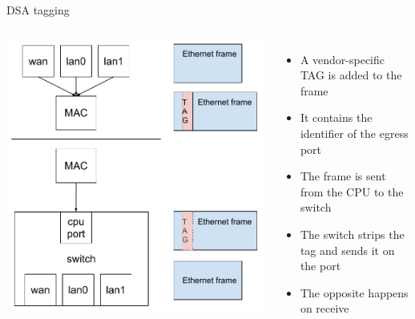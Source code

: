 \begin{frame}{DSA tagging}
	\begin{columns}
		\includegraphics[width=\textwidth]{slides/networking-driver-switch/dsa_tagging.pdf}
	\begin{itemize}
		\item A vendor-specific TAG is added to the frame
		\item It contains the identifier of the egress port
		\item The frame is sent from the CPU to the switch
		\item The switch strips the tag and sends it on the port
		\item The opposite happens on receive
	\end{itemize}
	\end{columns}

\end{frame}

